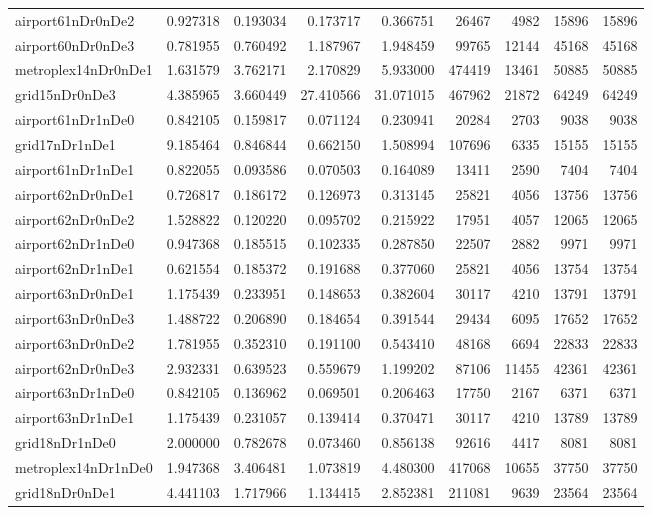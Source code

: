 \documentclass[../../../thesis.tex]{subfiles}
\begin{document}
\begin{longtable}{|l|r|r|r|r|r|r|r|r|}
airport61nDr0nDe2 & 0.927318 & 0.193034 & 0.173717 & 0.366751 & 26467 & 4982 & 15896 & 15896 \\
airport60nDr0nDe3 & 0.781955 & 0.760492 & 1.187967 & 1.948459 & 99765 & 12144 & 45168 & 45168 \\
metroplex14nDr0nDe1 & 1.631579 & 3.762171 & 2.170829 & 5.933000 & 474419 & 13461 & 50885 & 50885 \\
grid15nDr0nDe3 & 4.385965 & 3.660449 & 27.410566 & 31.071015 & 467962 & 21872 & 64249 & 64249 \\
airport61nDr1nDe0 & 0.842105 & 0.159817 & 0.071124 & 0.230941 & 20284 & 2703 & 9038 & 9038 \\
grid17nDr1nDe1 & 9.185464 & 0.846844 & 0.662150 & 1.508994 & 107696 & 6335 & 15155 & 15155 \\
airport61nDr1nDe1 & 0.822055 & 0.093586 & 0.070503 & 0.164089 & 13411 & 2590 & 7404 & 7404 \\
airport62nDr0nDe1 & 0.726817 & 0.186172 & 0.126973 & 0.313145 & 25821 & 4056 & 13756 & 13756 \\
airport62nDr0nDe2 & 1.528822 & 0.120220 & 0.095702 & 0.215922 & 17951 & 4057 & 12065 & 12065 \\
airport62nDr1nDe0 & 0.947368 & 0.185515 & 0.102335 & 0.287850 & 22507 & 2882 & 9971 & 9971 \\
airport62nDr1nDe1 & 0.621554 & 0.185372 & 0.191688 & 0.377060 & 25821 & 4056 & 13754 & 13754 \\
airport63nDr0nDe1 & 1.175439 & 0.233951 & 0.148653 & 0.382604 & 30117 & 4210 & 13791 & 13791 \\
airport63nDr0nDe3 & 1.488722 & 0.206890 & 0.184654 & 0.391544 & 29434 & 6095 & 17652 & 17652 \\
airport63nDr0nDe2 & 1.781955 & 0.352310 & 0.191100 & 0.543410 & 48168 & 6694 & 22833 & 22833 \\
airport62nDr0nDe3 & 2.932331 & 0.639523 & 0.559679 & 1.199202 & 87106 & 11455 & 42361 & 42361 \\
airport63nDr1nDe0 & 0.842105 & 0.136962 & 0.069501 & 0.206463 & 17750 & 2167 & 6371 & 6371 \\
airport63nDr1nDe1 & 1.175439 & 0.231057 & 0.139414 & 0.370471 & 30117 & 4210 & 13789 & 13789 \\
grid18nDr1nDe0 & 2.000000 & 0.782678 & 0.073460 & 0.856138 & 92616 & 4417 & 8081 & 8081 \\
metroplex14nDr1nDe0 & 1.947368 & 3.406481 & 1.073819 & 4.480300 & 417068 & 10655 & 37750 & 37750 \\
grid18nDr0nDe1 & 4.441103 & 1.717966 & 1.134415 & 2.852381 & 211081 & 9639 & 23564 & 23564 \\

\end{longtable}
\end{document}
